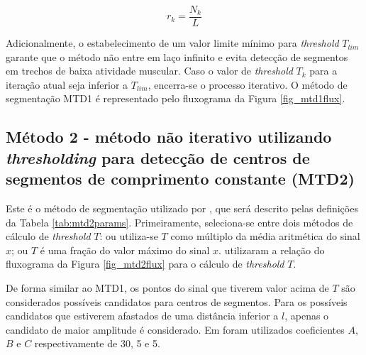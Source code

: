 \begin{equation}
\label{eq:mtd1rk}
  r_k = \frac{N_{k}}{L} 
\end{equation}

Adicionalmente, o estabelecimento de um valor limite mínimo para \emph{threshold} $T_{lim}$ garante que o método não entre em laço infinito e evita detecção de segmentos em trechos de baixa atividade muscular. Caso o valor de \emph{threshold} $T_k$ para a iteração atual seja inferior a $T_{lim}$, encerra-se o processo iterativo. O método de segmentação MTD1 é representado pelo fluxograma da Figura \ref{fig_mtd1flux}.



			\subsection{Método 2 - método não iterativo utilizando \emph{thresholding} para detecção de centros de segmentos de comprimento constante (MTD2)}
Este é o método de segmentação utilizado por , que será descrito pelas definições da Tabela \ref{tab:mtd2params}. Primeiramente, seleciona-se entre dois métodos de cálculo de \emph{threshold} $T$: ou utiliza-se $T$ como múltiplo da média aritmética do sinal $x$; ou $T$ é uma fração do valor máximo do sinal $x$.  utilizaram a relação do fluxograma da Figura \ref{fig_mtd2flux} para o cálculo de \emph{threshold} $T$.





De forma similar ao MTD1, os pontos do sinal que tiverem valor acima de $T$ são considerados possíveis candidatos para centros de segmentos. Para os possíveis candidatos que estiverem afastados de uma distância inferior a $l$, apenas o candidato de maior amplitude é considerado. Em  foram utilizados coeficientes $A$, $B$ e $C$ respectivamente de 30, 5 e 5.


